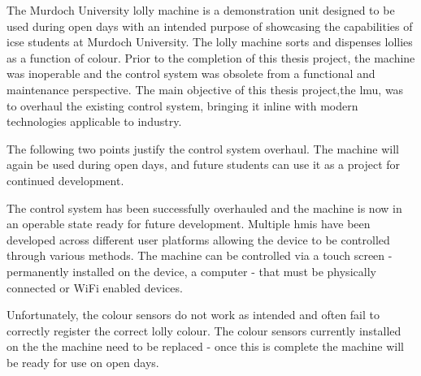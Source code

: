 The Murdoch University lolly machine is a demonstration unit designed to be used during open days with an intended purpose of showcasing the capabilities of \acrlong{icse} students at Murdoch University. The lolly machine sorts and dispenses lollies as a function of colour.  Prior to the completion of this thesis project, the machine was inoperable and the control system was obsolete from a functional and maintenance perspective. The main objective of this thesis project,the \acrlong{lmu}, was to overhaul the existing control system, bringing it inline with modern technologies applicable to industry. 

The following two points justify the control system overhaul. The machine will again be used during open days, and future students can use it as a project for continued development. 

The control system has been successfully overhauled and the machine is now in an operable state ready for future development. Multiple \acrlong{hmi}s have been developed across different user platforms allowing the device to be controlled through various methods. The machine can be controlled via a touch screen -  permanently installed on the device, a computer - that must be physically connected or WiFi enabled devices. 

Unfortunately, the colour sensors do not work as intended and often fail to correctly register the correct lolly colour. The colour sensors currently installed on the the machine need to be replaced - once this is complete the machine will be ready for use on open days. 